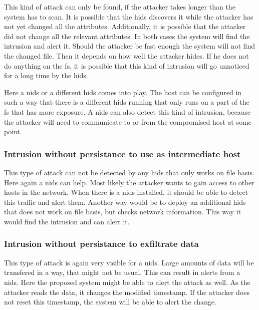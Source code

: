 This kind of attack can only be found, if the attacker takes longer than the system has to scan. It is possible that the \gls{hids} discovers it while the attacker has not yet changed all the attributes. Additionally, it is possible that the attacker did not change all the relevant attributes. In both cases the system will find the intrusion and alert it. Should the attacker be fast enough the system will not find the changed file. Then it depends on how well the attacker hides. If he does not do anything on the \gls{fs}, it is possible that this kind of intrusion will go unnoticed for a long time by the \gls{hids}. 

Here a \gls{nids} or a different \gls{hids} comes into play. The host can be configured in such a way that there is a different \gls{hids} running that only runs on a part of the \gls{fs} that has more exposure. A \gls{nids} can also detect this kind of intrusion, because the attacker will need to communicate to or from the compromised host at some point. 

\subsubsection{Intrusion without persistance to use as intermediate host}
\label{sec:defense:nopersistanceintermediatehost}

This type of attack can not be detected by any \gls{hids} that only works on file basis. Here again a \gls{nids} can help. Most likely the attacker wants to gain access to other hosts in the network. When there is a \gls{nids} installed, it should be able to detect this traffic and alert them. Another way would be to deploy an additional \gls{hids} that does not work on file basis, but checks network information. This way it would find the intrusion and can alert it.

\subsubsection{Intrusion without persistance to exfiltrate data}
\label{sec:defense:nopersistanceexfiltration}

This type of attack is again very visible for a \gls{nids}. Large amounts of data will be transfered in a way, that might not be usual. This can result in alerts from a \gls{nids}. Here the proposed system might be able to alert the attack as well. As the attacker reads the data, it changes the modified timestamp. If the attacker does not reset this timestamp, the system will be able to alert the change. 

